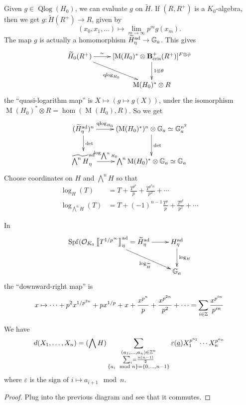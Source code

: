 Given $g\in \operatorname{Qlog}(H_0)$, we can evaluate $g$ on 
$\widetilde H$. If $(R,R^+)$ is a $K_0$-algebra, then we get 
$g:\widetilde H(R^+) \to R$, given by 
\[
  (x_0,x_1,\dots) \mapsto \lim_{m\to \infty} p^m g(x_m) .
\]
The map $g$ is actually a homomorphism $\widetilde H_\eta^{\textnormal{ad}}\to \mathbb{G}_a$. 
This gives 
\[\xymatrix{
  \widetilde H_0(R^+) \ar[r]^-\sim \ar[dr]_-{\operatorname{qlog}_{H_0}}
    & [\operatorname M(H_0)^\ast \otimes \bcris^+(R^+)]^{F\otimes \phi} \ar[d]^-{1\otimes \theta} \\
  & \operatorname M(H_0)^\ast \otimes R
}\]
the ``quasi-logarithm map'' is $X\mapsto (g\mapsto g(X))$, under the 
isomorphism $\operatorname{M}(H_0)^\ast\otimes R=\hom(\operatorname{M}(H_0),R)$. 
So we get 
\[\xymatrix{
  (\widetilde H_\eta^\ad)^n \ar[r]^-{\operatorname{qlog}_{H_0}} \ar[d]^-{\det} 
    & (\operatorname{M}(H_0)^\ast)^n\otimes \dG_a \simeq \dG_a^{n^2} \ar[d]^-{\det} \\
  \widetilde{\bigwedge^n H}_\eta^\ad \ar[r]^-{\log_{\bigwedge^n H_0}} 
    & \bigwedge^n \operatorname{M}(H_0)^\ast\otimes \dG_a \simeq \dG_a 
}\]
Choose coordinates on $H$ and $\bigwedge^n H$ so that 
\begin{align*}
  \log_H(T) &= T+\frac{T^{p^n}}{p} + \frac{T^{p^2 n}}{p^2} + \cdots \\
  \log_{\bigwedge^n H}(T) &= T+(-1)^{n-1} \frac{T^p}{p} + \frac{T^{p^2}}{p^2} + \cdots
\end{align*}

\begin{proposition}
In
\[\xymatrix{
  \spf(\cO_{K_0}\pow{T^{1/p^\infty}}_\eta^\ad = \widetilde H_\eta^\ad \ar[r] \ar[dr]_-{\log_{\widetilde H}}
    & H_\eta^\ad \ar[d]^-{\log_H} \\
  & \dG_a 
}\]
the ``downward-right map'' is 
\[
  x\mapsto \cdots + p^2 x^{1/p^{2 n}} + p x^{1/p} + x + \frac{x^{p^n}}{p} + \frac{x^{p^{2 n}}}{p^2} + \cdots = \sum_{i\in \mathbb{Z}} \frac{x^{p^{i n}}}{p^{i n}}
\]
\end{proposition}

\begin{proposition}
We have 
\[
  d(X_1,\dots,X_n) = (\bigwedge H) \sum_{\substack{(a_1,\dots,a_n)\in \mathbb{Z}^n \\ \sum _i = \frac{n(n-1)}{2} \\
  \{a_i\mod n\}=\{0,\dots,n-1\}}} \varepsilon(\underline a) X_1^{p^{a_1}} \cdots X_n^{p^{a_n}}
\]
where $\varepsilon$ is the sign of $i\mapsto a_{i+1} \mod n$. 
\end{proposition}
\begin{proof}
Plug into the previous diagram and see that it commutes. 
\end{proof}

